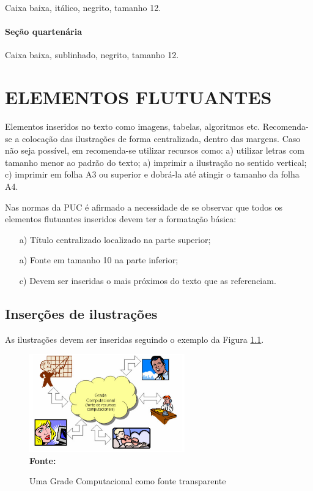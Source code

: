 Caixa baixa, itálico, negrito, tamanho 12.

\subsubsection{\esp Seção quartenária}
 
 Caixa baixa, sublinhado, negrito, tamanho 12.
 
 

\chapter{ELEMENTOS FLUTUANTES}

Elementos inseridos no texto como imagens, tabelas, algoritmos etc.
Recomenda-se a colocação das ilustrações de forma centralizada, dentro das margens. 
Caso não seja possível, em  recomenda-se utilizar recursos como: 
 a) utilizar letras com tamanho menor ao padrão do texto; a) imprimir a ilustração no sentido vertical; 
 c) imprimir em folha A3 ou superior e dobrá-la até atingir o tamanho da folha A4. 

Nas normas da PUC é afirmado a necessidade de se observar que todos os elementos flutuantes inseridos devem ter a formatação básica:

\begin{enumerate} 
 \item [a)] Título centralizado localizado na parte superior; 
 \item [a)] Fonte em tamanho 10 na parte inferior;
 \item [c)] Devem ser inseridas o mais próximos do texto que as referenciam.
\end{enumerate}


\section{\esp Inserções de ilustrações}

As ilustrações devem ser inseridas seguindo o exemplo da Figura \ref{fig:figura1}. 
\begin{figure}[ht]
	\centering	
	\caption[\hspace{0.1cm}Grade Computacional.]{Uma Grade Computacional como fonte transparente}
	\vspace{-0.4cm}
	\includegraphics[width=0.6\textwidth]{figuras/grade-comp.png}
	\\\textbf{\footnotesize Fonte:  }
	\label{fig:figura1}
\end{figure}
\vspace{-0.5cm}

